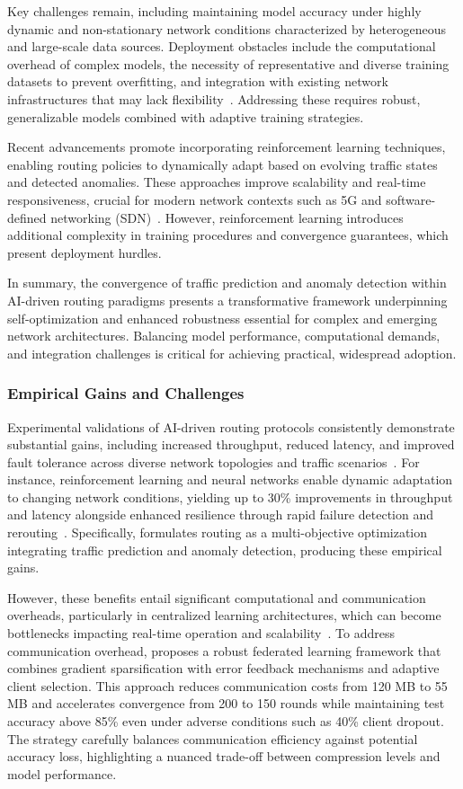 \documentclass[sigconf]{acmart}
\begin{document}
Key challenges remain, including maintaining model accuracy under highly dynamic and non-stationary network conditions characterized by heterogeneous and large-scale data sources. Deployment obstacles include the computational overhead of complex models, the necessity of representative and diverse training datasets to prevent overfitting, and integration with existing network infrastructures that may lack flexibility~\cite{ref50, ref53}. Addressing these requires robust, generalizable models combined with adaptive training strategies.

Recent advancements promote incorporating reinforcement learning techniques, enabling routing policies to dynamically adapt based on evolving traffic states and detected anomalies. These approaches improve scalability and real-time responsiveness, crucial for modern network contexts such as 5G and software-defined networking (SDN)~\cite{ref53}. However, reinforcement learning introduces additional complexity in training procedures and convergence guarantees, which present deployment hurdles.

In summary, the convergence of traffic prediction and anomaly detection within AI-driven routing paradigms presents a transformative framework underpinning self-optimization and enhanced robustness essential for complex and emerging network architectures. Balancing model performance, computational demands, and integration challenges is critical for achieving practical, widespread adoption.

\subsubsection{Empirical Gains and Challenges}

Experimental validations of AI-driven routing protocols consistently demonstrate substantial gains, including increased throughput, reduced latency, and improved fault tolerance across diverse network topologies and traffic scenarios~\cite{ref4,ref53}. For instance, reinforcement learning and neural networks enable dynamic adaptation to changing network conditions, yielding up to 30\% improvements in throughput and latency alongside enhanced resilience through rapid failure detection and rerouting~\cite{ref53}. Specifically, \cite{ref53} formulates routing as a multi-objective optimization integrating traffic prediction and anomaly detection, producing these empirical gains.

However, these benefits entail significant computational and communication overheads, particularly in centralized learning architectures, which can become bottlenecks impacting real-time operation and scalability~\cite{ref53}. To address communication overhead, \cite{ref4} proposes a robust federated learning framework that combines gradient sparsification with error feedback mechanisms and adaptive client selection. This approach reduces communication costs from 120 MB to 55 MB and accelerates convergence from 200 to 150 rounds while maintaining test accuracy above 85\% even under adverse conditions such as 40\% client dropout. The strategy carefully balances communication efficiency against potential accuracy loss, highlighting a nuanced trade-off between compression levels and model performance.
\end{document}
